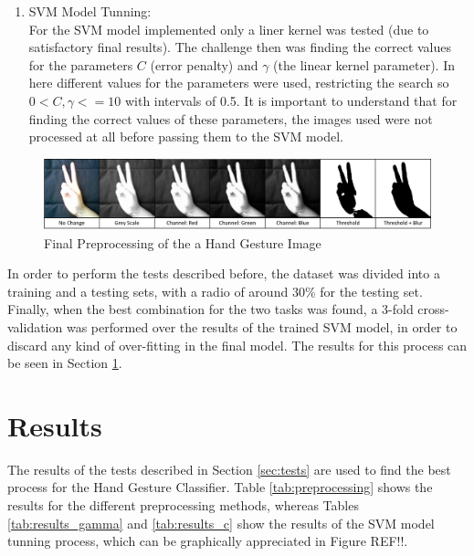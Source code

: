 \documentclass[a4paper,10pt,english]{article}
\begin{document}
\begin{enumerate}
            \item SVM Model Tunning:\\
                For the SVM model implemented only a liner kernel was tested (due to satisfactory final results). The challenge then was finding the correct values for the parameters $C$ (error penalty) and $\gamma$ (the linear kernel parameter). In here different values for the parameters were used, restricting the search so $ 0 < C, \gamma <= 10 $ with intervals of 0.5. It is important to understand that for finding the correct values of these parameters, the images used were not processed at all before passing them to the SVM model.
        \end{enumerate}
        
        \begin{figure}[h!]
            \centering
            \includegraphics[width=500pt]{images/test_preprocessing}
            \caption{Final Preprocessing of the a Hand Gesture Image} \label{fig:test_preprocessing}
        \end{figure}
                
        In order to perform the tests described before, the dataset was divided into a training and a testing sets, with a radio of around 30\% for the testing set. Finally, when the best combination for the two tasks was found, a 3-fold cross-validation was performed over the results of the trained SVM model, in order to discard any kind of over-fitting in the final model. The results for this process can be seen in Section \ref{sec:results}.
    
    \section{Results}\label{sec:results}
    
    The results of the tests described in Section \ref{sec:tests} are used to find the best process for the Hand Gesture Classifier. Table \ref{tab:preprocessing} shows the results for the different preprocessing methods, whereas Tables \ref{tab:results_gamma} and \ref{tab:results_c} show the results of the SVM model tunning process, which can be graphically appreciated in Figure REF!!.
\end{document}
